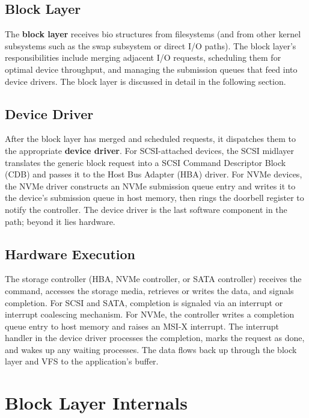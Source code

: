 \subsection{Block Layer}

The \textbf{block layer} receives bio structures from filesystems (and from other kernel subsystems such as the swap subsystem or direct I/O paths). The block layer's responsibilities include merging adjacent I/O requests, scheduling them for optimal device throughput, and managing the submission queues that feed into device drivers. The block layer is discussed in detail in the following section.

\subsection{Device Driver}

After the block layer has merged and scheduled requests, it dispatches them to the appropriate \textbf{device driver}. For SCSI-attached devices, the SCSI midlayer translates the generic block request into a SCSI Command Descriptor Block (CDB) and passes it to the Host Bus Adapter (HBA) driver. For NVMe devices, the NVMe driver constructs an NVMe submission queue entry and writes it to the device's submission queue in host memory, then rings the doorbell register to notify the controller. The device driver is the last software component in the path; beyond it lies hardware.

\subsection{Hardware Execution}

The storage controller (HBA, NVMe controller, or SATA controller) receives the command, accesses the storage media, retrieves or writes the data, and signals completion. For SCSI and SATA, completion is signaled via an interrupt or interrupt coalescing mechanism. For NVMe, the controller writes a completion queue entry to host memory and raises an MSI-X interrupt. The interrupt handler in the device driver processes the completion, marks the request as done, and wakes up any waiting processes. The data flows back up through the block layer and VFS to the application's buffer.

\section{Block Layer Internals}
\label{sec:block-layer}

